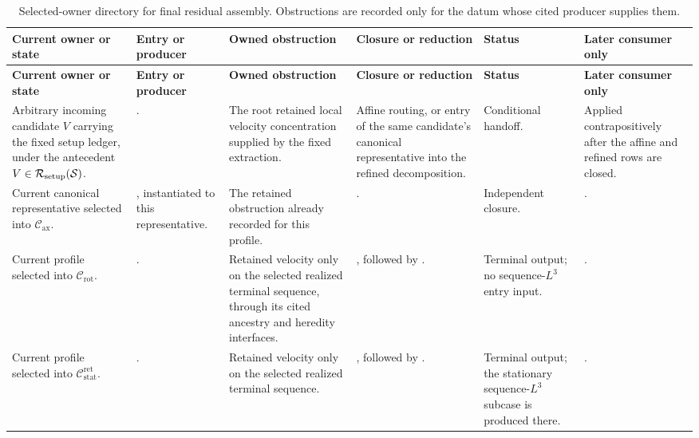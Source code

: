 \documentclass[11pt]{amsart}
\numberwithin{equation}{section}
\theoremstyle{plain}
\theoremstyle{definition}
\theoremstyle{remark}
\newcommand{\calS}{\mathcal S}
\newcommand{\calR}{\mathcal R}
\newcommand{\Cax}{\mathcal C_{\mathrm{ax}}}
\newcommand{\Crot}{\mathcal C_{\mathrm{rot}}}
\newcommand{\Cstat}{\mathcal C_{\mathrm{stat}}^{\mathrm{ret}}}
\begin{document}
\begingroup
\scriptsize
\setlength{\tabcolsep}{1.5pt}
\renewcommand{\arraystretch}{1.18}
\begin{longtable}{@{}L{0.14\textwidth}L{0.19\textwidth}L{0.17\textwidth}L{0.17\textwidth}L{0.10\textwidth}L{0.14\textwidth}@{}}
\caption{Selected-owner directory for final residual assembly.  Obstructions
are recorded only for the datum whose cited producer supplies them.}
\label{tab:final-selected-owner-directory}\\
\hline
\textbf{Current owner or state} & \textbf{Entry or producer} &
\textbf{Owned obstruction} & \textbf{Closure or reduction} &
\textbf{Status} & \textbf{Later consumer only}\\
\hline
\endfirsthead
\hline
\textbf{Current owner or state} & \textbf{Entry or producer} &
\textbf{Owned obstruction} & \textbf{Closure or reduction} &
\textbf{Status} & \textbf{Later consumer only}\\
\hline
\endhead
\hline
\endfoot
Arbitrary incoming candidate \(V\) carrying the fixed setup ledger, under the
antecedent \(V\in\calR_{\rm setup}(\calS)\). &
. &
The root retained local velocity concentration supplied by the fixed
extraction. &
Affine routing, or entry of the same candidate's canonical representative into
the refined decomposition. &
Conditional handoff. &
Applied contrapositively after the affine and refined rows are closed.\\

Current canonical representative selected into \(\Cax\). &
, instantiated to this representative. &
The retained obstruction already recorded for this profile. &
. &
Independent closure. &
.\\

Current profile selected into \(\Crot\). &
. &
Retained velocity only on the selected realized terminal sequence, through its
cited ancestry and heredity interfaces. &
, followed by . &
Terminal output; no sequence-\(L^3\) entry input. &
.\\

Current profile selected into \(\Cstat\). &
. &
Retained velocity only on the selected realized terminal sequence. &
, followed by . &
Terminal output; the stationary sequence-\(L^3\) subcase is produced there. &
.\\


\end{longtable}
\end{document}

